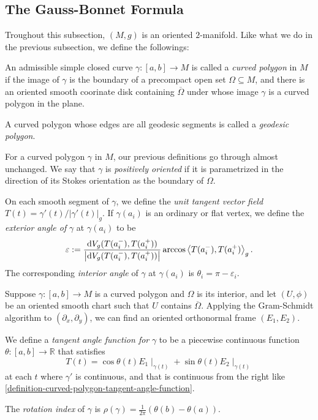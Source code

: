 \subsection{The Gauss-Bonnet Formula}
\label{subsection-Gauss-Bonnet-formula}
Troughout this subsection, \( (M, g) \) is an oriented \( 2 \)-manifold.
Like what we do in the previous subsection, we define the followings:
\begin{definition}
  \label{definition-curved-polygon-in-2-manifold}
  \label{definition-geodesic-polygon-in-2-manifold}
  \label{definition-positively-oriented-curve-in-2-manifold}
  \label{definition-angle-in-2-manifold}
  An admissible simple closed curve \( \gamma: [a, b] \to M \) is called a \emph{curved polygon} in \( M \) if the image of \( \gamma \) is the boundary of a precompact open set \( \Omega \subseteq M \), and there is an oriented smooth coorinate disk containing \( \overline{\Omega} \) under whose image \( \gamma \) is a curved polygon in the plane.

  A curved polygon whose edges are all geodesic segments is called a \emph{geodesic polygon}.

  For a curved polygon \( \gamma \) in \( M \), our previous definitions go through almost unchanged.
  We say that \( \gamma \) is \emph{positively oriented} if it is parametrized in the direction of its Stokes orientation as the boundary of \( \Omega \).

  On each smooth segment of \( \gamma \), we define the \emph{unit tangent vector field} \( T(t) = \gamma'(t) / \left\lvert \gamma'(t) \right\rvert_g \).
  If \( \gamma(a_i) \) is an ordinary or flat vertex, we define the \emph{exterior angle of} \( \gamma \) at \( \gamma(a_i) \) to be
  \[
    \varepsilon := \frac{\mathop{}\!\mathrm{d} V_g (T(a_i^-), T(a_i^+))}{\left\lvert \mathop{}\!\mathrm{d} V_g (T(a_i^-), T(a_i^+)) \right\rvert} \arccos \left\langle T(a^-_i), T(a_i^+) \right\rangle_g.
  \]
  The corresponding \emph{interior angle} of \( \gamma \) at \( \gamma(a_i) \) is \( \theta_i = \pi - \varepsilon_i \).
\end{definition}

\begin{definition}
  \label{definition-tangent-angle-function-in-2-manifold}
  \label{definition-rotation-index-in-2-manifold}
  Suppose \( \gamma: [a, b] \to M \) is a curved polygon and \( \Omega \) is its interior, and let \( (U, \phi) \) be an oriented smooth chart such that \( U \) contains \( \overline{\Omega} \).
  Applying the Gram-Schmidt algorithm to \( (\partial_x, \partial_y) \), we can find an oriented orthonormal frame \( (E_1, E_2) \).

  We define a \emph{tangent angle function for} \( \gamma \) to be a piecewise continuous function \( \theta: [a, b] \to \mathbb{R} \) that satisfies
  \[
    T(t) = \cos \theta(t) E_1 \mid_{\gamma(t)} + \sin \theta(t) E_2 \mid_{\gamma(t)}
  \]
  at each \( t \) where \( \gamma' \) is continuous, and that is continuous from the right like \ref{definition-curved-polygon-tangent-angle-function}.

  The \emph{rotation index} of \( \gamma \) is \( \rho(\gamma) = \frac{1}{2 \pi} (\theta(b) - \theta(a)) \).
\end{definition}

